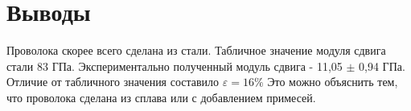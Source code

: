 \documentclass[a4paper,14pt]{extarticle}
\begin{document}
	\section{Выводы}
	Проволока скорее всего сделана из стали. Табличное значение модуля сдвига стали 83 ГПа. Экспериментально полученный модуль сдвига - 11,05 $\pm$ 0,94 ГПа. Отличие от табличного значения составило $\varepsilon = 16\%$
	Это можно объяснить тем, что проволока сделана из сплава или с добавлением примесей.
\end{document}
